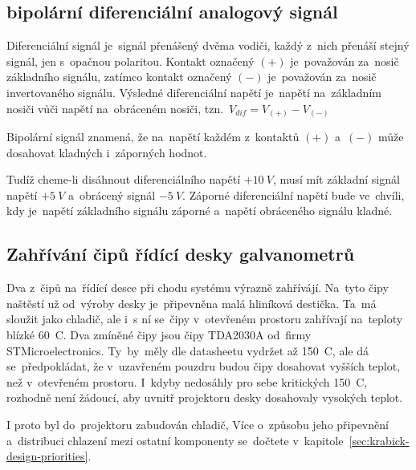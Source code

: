 \subsection{bipolární diferenciální analogový signál~\cite{ilda-signal-spec}}
Diferenciální signál je~signál přenášený dvěma vodiči, každý z~nich přenáší stejný signál, jen s~opačnou polaritou. Kontakt označený $(+)$ je~považován za~nosič základního signálu, zatímco kontakt označený $(-)$ je~považován za~nosič invertovaného signálu. Výsledné diferenciální napětí je~napětí na~základním nosiči vůči napětí na~obráceném nosiči, tzn.~$V_{dif} = V_{(+)} - V_{(-)}$

Bipolární signál znamená, že na~napětí každém z~kontaktů $(+)$ a~$(-)$ může dosahovat kladných i~záporných hodnot.

Tudíž cheme-li disáhnout diferenciálního napětí $+10~V$, musí mít základní signál napětí $+5~V$ a~obrácený signál $-5~V$. Záporné diferenciální napětí bude ve~chvíli, kdy je~napětí základního signálu záporné a~napětí obráceného signálu kladné.

\subsection{Zahřívání čipů řídící desky galvanometrů} \label{sec:galvoboard-chips-heating-up}
Dva z~čipů na~řídící desce při chodu systému výrazně zahřívájí. Na~tyto čipy naštěstí už od~výroby desky je~připevněna malá hliníková destička. Ta~má sloužit jako chladič, ale i~s ní se~čipy v~otevřeném prostoru zahřívají na~teploty blízké 60~\degree{}C.
Dva zmíněné čipy jsou čipy TDA2030A od~firmy STMicroelectronics. Ty~by~měly dle datasheetu vydržet až 150~\degree{}C, ale dá se~předpokládat, že v~uzavřeném pouzdru budou čipy dosahovat vyšších teplot, než v~otevřeném prostoru. I~kdyby nedosáhly pro sebe kritických 150~\degree{}C, rozhodně není žádoucí, aby uvnitř projektoru desky dosahovaly vysokých teplot.

I proto byl do~projektoru zabudován chladič, Více o~způsobu jeho připevnění a~distribuci chlazení mezi ostatní komponenty se~dočtete v~kapitole~\ref{sec:krabick-design-priorities}.
